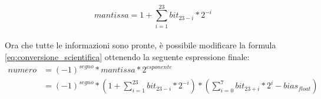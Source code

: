\documentclass[Lau, oneside]{sapthesis}%
\begin{document}
\ \\
\begin{equation}
    mantissa = 1 + \sum_{i=1}^{23} bit_{23-i}*2^{-i} 
\end{equation}
\ \\
\newline
Ora che tutte le informazioni sono pronte, è possibile modificare la formula \eqref{eq:conversione_scientifica} ottenendo la seguente espressione finale:
\begin{equation}
    \begin{aligned}
        numero &= (-1)^{segno} * mantissa * 2^{esponente} \\
        &= (-1)^{segno} *( 1 + \sum_{i=1}^{23} bit_{23-i}*2^{-i}) * (\sum_{i=0}^{7} bit_{23+i}*2^{i} - bias_{float})
    \end{aligned}
\end{equation}
\end{document}
